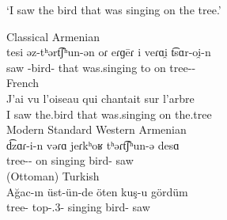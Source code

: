 \begin{exe}
	\ex\label{sent:IntroAdjarian:syntaxArmCaTuFrench}   \begin{xlist}
		
		\ex `I saw the bird that was singing on the tree.'\begin{xlist}
			\ex Classical Armenian\\ \gll 
			tesi əz-tʰərt͡ʃʰun-ən oɾ eɾɡēɾ i veɾɑi̯ t͡sɑr-oi̯-n \\
			saw {\acc}-bird-{\dist} that was.singing to on tree-{\gen}-{\dist} \\
			\trans {}
			\ex French \\\gll 
			J'ai vu l'oiseau qui chantait sur l'arbre \\
			I saw the.bird that was.singing   on the.tree \\
			\ex Modern Standard Western Armenian \\ \gll 
			d͡zɑɾ-i-n vəɾɑ jeɾkʰoʁ tʰəɾt͡ʃʰun-ə desɑ \\
			tree-{\gen}-{} on singing bird-{} saw \\
			\trans {}
			\ex (Ottoman) Turkish\\ \gll
			Ağac-ın üst-ün-de öten kuş-u gördüm \\
			tree-{\gen} top-{\poss}.3{\sg}-{\loc} singing bird-{\acc} saw \\


\end{xlist}
\end{xlist}
\end{exe}
